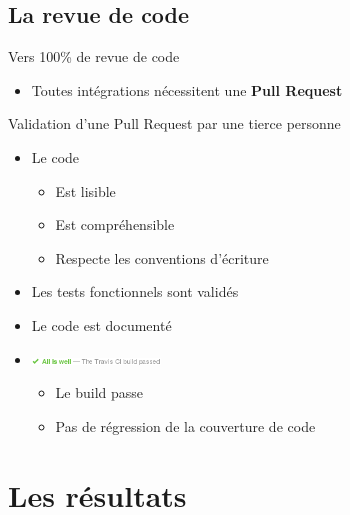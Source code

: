 \documentclass{beamer}
\begin{document}
		\subsection{La revue de code}
		\begin{frame}{Vers 100\% de revue de code}
			\begin{itemize}
				\item Toutes intégrations nécessitent une \textbf{Pull Request}
			\end{itemize}
			\vfill
			\pause
			\begin{block}{\normalsize Validation d'une Pull Request par une tierce personne}
				\begin{itemize}
					\item Le code
						\begin{itemize}
							\item Est lisible
							\item Est compréhensible
							\item Respecte les conventions d'écriture
						\end{itemize}
					\item Les tests fonctionnels sont validés
					\item Le code est documenté
					\item \includegraphics[height=7px]{images/all_is_well.png}
						\begin{itemize}
							\item Le build passe
							\item Pas de régression de la couverture de code
						\end{itemize}
				\end{itemize}
			\end{block}	
		\end{frame}
		\section{Les résultats} %
\end{document}
